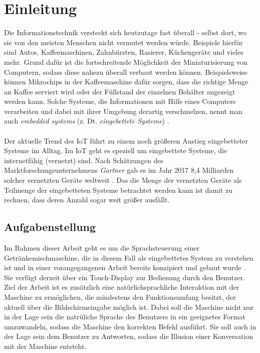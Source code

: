 \chapter{Einleitung}
Die Informationstechnik versteckt sich heutzutage fast überall - selbst dort, wo sie von den meisten Menschen nicht vermutet werden würde. Beispiele hierfür sind Autos, Kaffeemaschinen, Zahnbürsten, Rasierer, Küchengeräte und vieles mehr. Grund dafür ist die fortschreitende Möglichkeit der Miniaturisierung von Computern, sodass diese nahezu überall verbaut werden können. Beispielsweise können Mikrochips in der Kaffeemaschine dafür sorgen, dass die richtige Menge an Kaffee serviert wird oder der Füllstand der einzelnen Behälter angezeigt werden kann. Solche Systeme, die Informationen mit Hilfe eines Computers verarbeiten und dabei mit ihrer Umgebung derartig \glqq{}verschmelzen\grqq{}, nennt man auch \textit{embedded systems} (z. Dt. \textit{eingebettete Systeme}) \cite{marwedel_eingebettete_2021}.\\\\
Der aktuelle Trend des \ac{IoT} führt zu einem noch größeren Anstieg eingebetteter Systeme im Alltag. Im \ac{IoT} geht es speziell um eingebettete Systeme, die internetfähig (vernetzt) sind. Nach Schätzungen des Marktforschungsunternehmens \textit{Gartner} gab es im Jahr 2017 8,4 Milliarden solcher vernetzten Geräte weltweit \cite{jansen_digitalisierung_2017}. Das die Menge der vernetzten Geräte als Teilmenge der eingebetteten Systeme betrachtet werden kann ist damit zu rechnen, dass deren Anzahl sogar weit größer ausfällt.

\section{Aufgabenstellung}
Im Rahmen dieser Arbeit geht es um die Sprachsteuerung einer Getränkemischmaschine, die in diesem Fall als eingebettetes System zu verstehen ist und in einer vorangegangenen Arbeit bereits konzipiert und gebaut wurde \cite{mischmaschine}. Sie verfügt derzeit über ein Touch-Display zur Bedienung durch den Benutzer. Ziel der Arbeit ist es zusätzlich eine natürlichsprachliche Interaktion mit der Maschine zu ermöglichen, die mindestens den Funktionsumfang besitzt, der aktuell über die Bildschirmeingabe möglich ist. Dabei soll die Maschine nicht nur in der Lage sein die natrüliche Sprache des Benutzers in ein geeignetes Format umzuwandeln, sodass die Maschine den korrekten Befehl ausführt. Sie soll auch in der Lage sein dem Benutzer zu Antworten, sodass die Illusion einer Konversation mit der Maschine entsteht.

